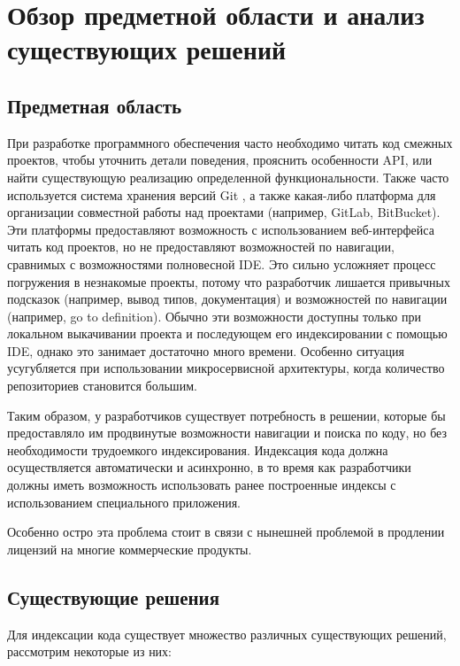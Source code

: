 \chapter{Обзор предметной области и анализ существующих решений}
\label{chap:overview}

\section{Предметная область}

При разработке программного обеспечения часто необходимо читать код смежных проектов, чтобы уточнить детали поведения, прояснить особенности API, или найти существующую реализацию определенной функциональности.
Также часто используется система хранения версий Git \cite{git-paper}, а также какая-либо платформа для организации совместной работы над проектами (например, GitLab, BitBucket).
Эти платформы предоставляют возможность с использованием веб-интерфейса читать код проектов, но не предоставляют возможностей по навигации, сравнимых с возможностями полновесной \gls{IDE}.
Это сильно усложняет процесс погружения в незнакомые проекты, потому что разработчик лишается привычных подсказок (например, вывод типов, документация) и возможностей по навигации (например, go to definition).
Обычно эти возможности доступны только при локальном выкачивании проекта и последующем его индексировании с помощью \gls{IDE}, однако это занимает достаточно много времени.
Особенно ситуация усугубляется при использовании микросервисной архитектуры, когда количество репозиториев становится большим.

Таким образом, у разработчиков существует потребность в решении, которые бы предоставляло им продвинутые возможности навигации и поиска по коду, но без необходимости трудоемкого индексирования.
Индексация кода должна осуществляется автоматически и асинхронно, в то время как разработчики должны иметь возможность использовать ранее построенные индексы с использованием специального приложения.

Особенно остро эта проблема стоит в связи с нынешней проблемой в продлении лицензий на многие коммерческие продукты.

\section{Существующие решения}

Для индексации кода существует множество различных существующих решений, рассмотрим некоторые из них:

